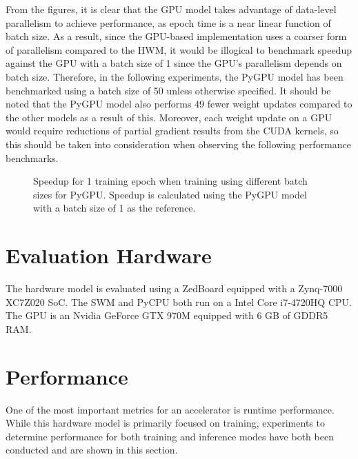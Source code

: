 From the figures, it is clear that the GPU model takes advantage of data-level parallelism to achieve performance, as epoch time is a near linear function of batch size. As a result, since the GPU-based implementation uses a coarser form of parallelism compared to the HWM, it would be illogical to benchmark speedup against the GPU with a batch size of 1 since the GPU's parallelism depends on batch size. Therefore, in the following experiments, the PyGPU model has been benchmarked using a batch size of 50 unless otherwise specified. It should be noted that the PyGPU model also performs 49 fewer weight updates compared to the other models as a result of this. Moreover, each weight update on a GPU would require reductions of partial gradient results from the CUDA kernels, so this should be taken into consideration when observing the following performance benchmarks.

\begin{figure}
	\centering
	\caption{Speedup for 1 training epoch when training using different batch sizes for PyGPU. Speedup is calculated using the PyGPU model with a batch size of 1 as the reference.}
	\label{gpu-speedup}
\end{figure}

\section{Evaluation Hardware}
The hardware model is evaluated using a ZedBoard equipped with a Zynq-7000 XC7Z020 SoC. The SWM and PyCPU both run on a Intel Core i7-4720HQ CPU. The GPU is an Nvidia GeForce GTX 970M equipped with 6 GB of GDDR5 RAM.

\section{Performance}
One of the most important metrics for an accelerator is runtime performance. 
While this hardware model is primarily focused on training, experiments to determine performance for both training and inference modes have both been conducted and are shown in this section.

